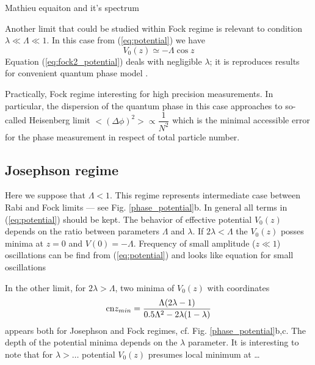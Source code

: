 \documentclass[aps, pre, preprint, groupedaddress, superscriptaddress, showkeys, showpacs] {revtex4-1}
\begin{document}
{\red Mathieu equaiton and it's spectrum}

Another limit that could be studied within Fock regime is relevant to condition $\lambda \ll \Lambda \ll 1$.
In this case from (\ref{eq:potential}) we have
% 
\begin{equation}
V_0(z) \simeq -\Lambda \cos{z}
\label{eq:fock2_potential}
\end{equation}
%
Equation (\ref{eq:fock2_potential}) deals with negligible $\lambda$; it is reproduces results for convenient quantum phase model \cite{40}.

Practically, Fock regime interesting for high precision measurements.
In particular, the dispersion of the quantum phase in this case approaches to so-called Heisenberg limit {\red $< (\Delta\phi)^2 > \propto \dfrac{1}{N^2}$} which is the minimal accessible error for the phase measurement in respect of total particle number.

\subsection{Josephson regime}

Here we suppose that {\red $\Lambda < 1$}.
This regime represents intermediate case between Rabi and Fock limits --- see Fig. \ref{phase_potential}b.
In general all terms in (\ref{eq:potential}) should be kept.
The behavior of effective potential $V_0(z)$ depends on the ratio between parameters $\Lambda$ and $\lambda$.
If $2\lambda < \Lambda$ the $V_0(z)$ posses minima at $z = 0$ and $V(0) = -\Lambda$.
Frequency of small amplitude ($z \ll 1$) oscillations can be find from (\ref{eq:potential}) and looks like
{\red equation for small oscillations}

In the other limit, for $2 \lambda > \Lambda$, two minima of $V_0(z)$ with coordinates
%
\begin{equation}
\textrm{cn}{z_{min}} = \frac{\Lambda (2 \lambda - 1)}{0.5 \Lambda^2 - 2 \lambda (1 - \lambda)}
\label{eq:z_minima}
\end{equation}
%
appears both for Josephson and Fock regimes, cf. Fig. \ref{phase_potential}b,c.  
The depth of the potential minima depends on the $\lambda$ parameter.
It is interesting to note that for {\red $\lambda > \dots$} potential $V_0(z)$ presumes local minimum at \dots
\end{document}
